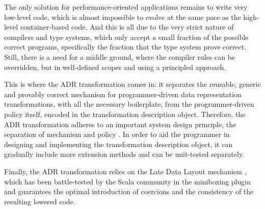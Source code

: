 The only solution for performance-oriented applications remains to write very low-level code, which is almost impossible to evolve at the same pace as the high-level container-based code. And this is all due to the very strict nature of compilers and type systems, which only accept a small fraction of the possible correct programs, specifically the fraction that the type system prove correct. Still, there is a need for a middle ground, where the compiler rules can be overridden, but in well-defined scopes and using a principled approach. %

This is where the ADR transformation comes in: it separates the reusable, generic and provably correct mechanism for programmer-driven data representation transformations, with all the necessary boilerplate, from the programmer-driven policy itself, encoded in the transformation description object. Therefore, the ADR transformation adheres to an important system design principle, the separation of mechanism and policy \cite{lampson-mechanism-policy}. In order to aid the programmer in designing and implementing the transformation description object, it can gradually include more extension methods and can be unit-tested separately. %

Finally, the ADR transformation relies on the Late Data Layout mechanism \cite{ldl,ldl-www}, which has been battle-tested by the Scala community in the miniboxing plugin \cite{miniboxing,miniboxing-www} and guarantees the optimal introduction of coercions and the consistency of the resulting lowered code.
